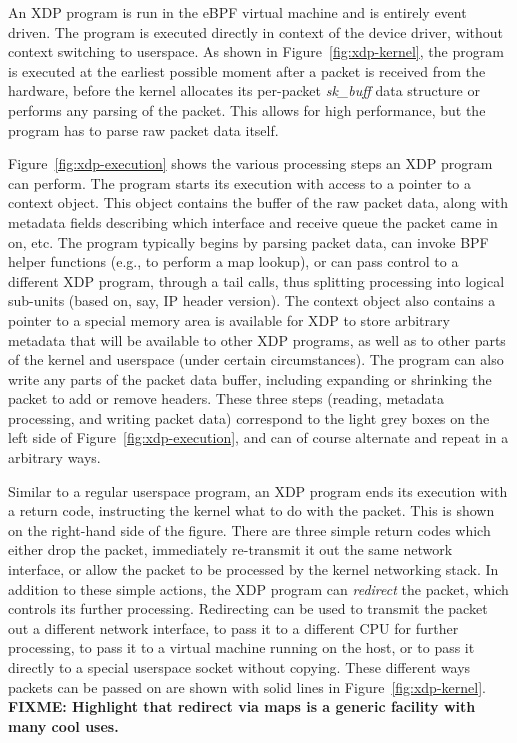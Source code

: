 \documentclass[10pt,sigconf]{acmart}
\begin{document}
An XDP program is run in the eBPF virtual machine and is entirely event driven.
The program is executed directly in context of the device driver, without
context switching to userspace. As shown in Figure~\ref{fig:xdp-kernel}, the
program is executed at the earliest possible moment after a packet is received
from the hardware, before the kernel allocates its per-packet \emph{sk\_buff}
data structure or performs any parsing of the packet. This allows for high
performance, but the program has to parse raw packet data itself.

Figure~\ref{fig:xdp-execution} shows the various processing steps an XDP program
can perform. The program starts its execution with access to a pointer to a
context object. This object contains the buffer of the raw packet data, along
with metadata fields describing which interface and receive queue the packet
came in on, etc. The program typically begins by parsing packet data, can invoke
BPF helper functions (e.g., to perform a map lookup), or can pass control to a
different XDP program, through a tail calls, thus splitting processing into
logical sub-units (based on, say, IP header version). The context object also
contains a pointer to a special memory area is available for XDP to store
arbitrary metadata that will be available to other XDP programs, as well as to
other parts of the kernel and userspace (under certain circumstances). The
program can also write any parts of the packet data buffer, including expanding
or shrinking the packet to add or remove headers. These three steps (reading,
metadata processing, and writing packet data) correspond to the light grey boxes
on the left side of Figure~\ref{fig:xdp-execution}, and can of course alternate
and repeat in a arbitrary ways.

Similar to a regular userspace program, an XDP program ends its execution with a
return code, instructing the kernel what to do with the packet. This is shown on
the right-hand side of the figure. There are three simple return codes which
either drop the packet, immediately re-transmit it out the same network
interface, or allow the packet to be processed by the kernel networking stack.
In addition to these simple actions, the XDP program can \emph{redirect} the
packet, which controls its further processing. Redirecting can be used to
transmit the packet out a different network interface, to pass it to a different
CPU for further processing, to pass it to a virtual machine running on the host,
or to pass it directly to a special userspace socket without copying. These
different ways packets can be passed on are shown with solid lines in
Figure~\ref{fig:xdp-kernel}. \textbf{FIXME: Highlight that redirect via maps is
  a generic facility with many cool uses.}
\end{document}
